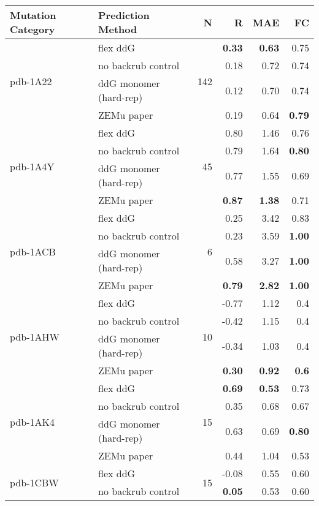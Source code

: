 \begin{table}
  \begin{tabular}{llrrrr}
\toprule
Mutation Category &       Prediction Method &   N &     R &  MAE &   FC \\
\midrule
 \multirow{ 4}{*}{pdb-1A22} & flex ddG & \multirow{ 4}{*}{142} & \textbf{0.33} & \textbf{0.63} & 0.75  \\
 & no backrub control & & 0.18 & 0.72 & 0.74  \\
 & ddG monomer (hard-rep) & & 0.12 & 0.70 & 0.74  \\
 & ZEMu paper & & 0.19 & 0.64 & \textbf{0.79}  \\
\hline
 \multirow{ 4}{*}{pdb-1A4Y} & flex ddG & \multirow{ 4}{*}{45} & 0.80 & 1.46 & 0.76  \\
 & no backrub control & & 0.79 & 1.64 & \textbf{0.80}  \\
 & ddG monomer (hard-rep) & & 0.77 & 1.55 & 0.69  \\
 & ZEMu paper & & \textbf{0.87} & \textbf{1.38} & 0.71  \\
\hline
 \multirow{ 4}{*}{pdb-1ACB} & flex ddG & \multirow{ 4}{*}{6} & 0.25 & 3.42 & 0.83  \\
 & no backrub control & & 0.23 & 3.59 & \textbf{1.00}  \\
 & ddG monomer (hard-rep) & & 0.58 & 3.27 & \textbf{1.00}  \\
 & ZEMu paper & & \textbf{0.79} & \textbf{2.82} & \textbf{1.00}  \\
\hline
 \multirow{ 4}{*}{pdb-1AHW} & flex ddG & \multirow{ 4}{*}{10} & -0.77 & 1.12 & 0.4  \\
 & no backrub control & & -0.42 & 1.15 & 0.4  \\
 & ddG monomer (hard-rep) & & -0.34 & 1.03 & 0.4  \\
 & ZEMu paper & & \textbf{0.30} & \textbf{0.92} & \textbf{0.6}  \\
\hline
 \multirow{ 4}{*}{pdb-1AK4} & flex ddG & \multirow{ 4}{*}{15} & \textbf{0.69} & \textbf{0.53} & 0.73  \\
 & no backrub control & & 0.35 & 0.68 & 0.67  \\
 & ddG monomer (hard-rep) & & 0.63 & 0.69 & \textbf{0.80}  \\
 & ZEMu paper & & 0.44 & 1.04 & 0.53  \\
\hline
 \multirow{ 4}{*}{pdb-1CBW} & flex ddG & \multirow{ 4}{*}{15} & -0.08 & 0.55 & 0.60  \\
 & no backrub control & & \textbf{0.05} & 0.53 & 0.60  \\

\end{tabular}
\end{table}
